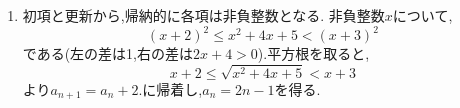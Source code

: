 \noindent {}\par\nobreak
\begin{enumerate}[label=(\arabic*),parsep=3pt,beginpenalty=10000,format=\bookitemlink{example-gauss-role-1}{solution}{problem}]
  \item 初項と更新から,帰納的に各項は非負整数となる.
    非負整数$x$について,
    \[
      (x+2)^2\le x^2+4x+5<(x+3)^2
    \]
    である(左の差は1,右の差は$2x+4>0$).平方根を取ると,
    \[
      x+2\le\sqrt{x^2+4x+5}<x+3
    \]
    より$a_{n+1}=a_n+2$.に帰着し,$a_n=2n-1$を得る.
\end{enumerate}
